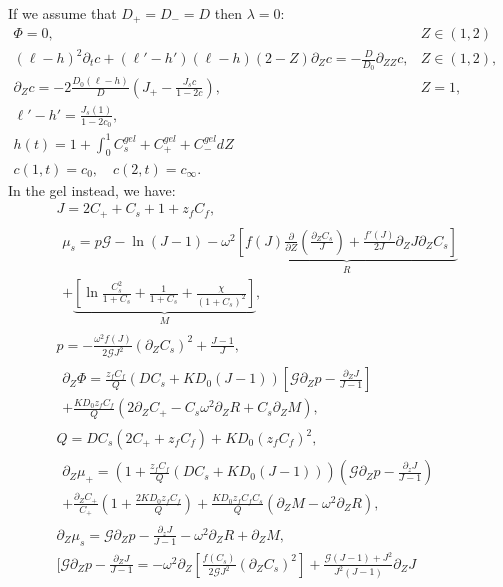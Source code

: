 \documentclass[12pt]{extarticle}
\begin{document}
 If we assume that $D_+=D_-=D$ then $\lambda=0$:
\begin{eqnarray}
\Phi = 0, &Z\in\left(1,2\right)&\\[2mm]
(\ell-h)^2\partial_t c + (\ell'-h') (\ell-h)(2-Z)\partial_Z c=-\frac{D}{D_0}\partial_{ZZ} c, &Z\in\left(1,2\right),&
\\\partial_Z c=-2\frac{D_0(\ell-h)}{D}\left(J_+-\frac{J_s c}{1-2c}\right) , & Z=1,&\\
\ell'-h'=\frac{J_s(1)}{1-2c_0},\\
h(t)=1+\int_0^1{C^{gel}_s+C^{gel}_++C^{gel}_-}dZ\\
c(1,t)=c_0, \quad c(2,t)=c_\infty.
\end{eqnarray}
In the gel instead, we have:
\begin{gather}
J=2C_++C_s+1+z_fC_f,\\
\begin{aligned}
\mu_s = p \mathcal{G} -\ln(J-1) - \omega^2\underbrace{\left[f(J)\frac{\partial}{\partial Z} \left(\frac{\partial_ZC_s}{J}\right)+\frac{f'(J)}{2J}\partial_Z J\partial_Z C_s\right]}_{R}\\
+\underbrace{ \left[\ln \frac{C^2_s}{1+C_s} + \frac{1}{1+C_s}+\frac{\chi}{(1+C_s)^2} \right]}_{M}, 
\end{aligned}\\[2.5mm]
p=-\frac{\omega^2 f(J)}{2\mathcal{G}J^2} (\partial_Z C_s)^2+ \frac{J-1}{J},\\[2mm]
\begin{aligned}
\partial_Z \Phi = \frac{z_fC_f}{Q}\left(DC_s+KD_0(J-1)\right)\left[\mathcal{G}\partial_Zp-\frac{\partial_ZJ}{J-1}\right]\\
+\frac{KD_0z_fC_f}{Q}\left(2\partial_ZC_+-C_s\omega^2\partial_ZR+C_s\partial_Z M\right),
\end{aligned}\\[2mm]
Q=DC_s(2C_++z_fC_f)+KD_0(z_fC_f)^2,\\[3mm]
\begin{aligned}
\partial_Z\mu_+=\left(1+\frac{z_fC_f}{Q}\left(DC_s+KD_0(J-1)\right)\right)\left(\mathcal{G}\partial_Zp-\frac{\partial_zJ}{J-1}\right)\\
+\frac{\partial_Z C_+}{C_+}\left(1+\frac{2KD_0z_fC_f}{Q}\right)+\frac{KD_0z_fC_fC_s}{Q}\left(\partial_Z M - \omega^2\partial_Z R\right),
\end{aligned}\\[2mm]
\partial_Z \mu_s = \mathcal{G}\partial_Zp-\frac{\partial_zJ}{J-1}-\omega^2 \partial_ZR+\partial_Z M,\\[2mm]
[\mathcal{G}\partial_Zp-\frac{\partial_ZJ}{J-1}= -\omega^2\partial_Z\left[\frac{ f(C_s)}{2\mathcal{G}J^2} (\partial_Z C_s)^2\right]+\frac{\mathcal{G}(J-1)+J^2}{J^2(J-1)}\partial_ZJ\\

\end{gather}
\end{document}
